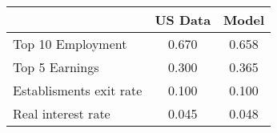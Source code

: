  \begin{tabular}{lcc} \hline 
  & US Data & Model \\ 
 \hline 
Top 10 Employment  &    0.670 &    0.658 \\ 
Top 5 Earnings  &    0.300 &    0.365 \\ 
Establisments exit rate  &    0.100 &    0.100 \\ 
Real interest rate  &    0.045 &    0.048 \\ 
\hline 
 \end{tabular} 
